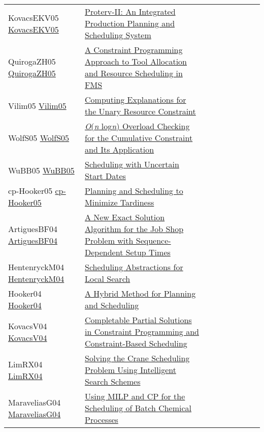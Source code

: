 {\begin{longtable}{p{3cm}p{7cm}lllllll}
KovacsEKV05 \href{https://doi.org/10.1007/11564751\_118}{KovacsEKV05} &  \href{papers/KovacsEKV05.pdf}{Proterv-II: An Integrated Production Planning and Scheduling System} &  &  &  &  &  &  & \\
QuirogaZH05 \href{https://doi.org/10.1109/ROBOT.2005.1570686}{QuirogaZH05} &  \href{papers/QuirogaZH05.pdf}{A Constraint Programming Approach to Tool Allocation and Resource Scheduling in {FMS}} &  &  &  &  &  &  & \\
Vilim05 \href{https://doi.org/10.1007/11493853\_29}{Vilim05} &  \href{papers/Vilim05.pdf}{Computing Explanations for the Unary Resource Constraint} &  &  &  &  &  &  & \\
WolfS05 \href{https://doi.org/10.1007/11963578\_8}{WolfS05} &  \href{papers/WolfS05.pdf}{\emph{O}(\emph{n} log\emph{n}) Overload Checking for the Cumulative Constraint and Its Application} &  &  &  &  &  &  & \\
WuBB05 \href{https://doi.org/10.1007/11564751\_110}{WuBB05} &  \href{papers/WuBB05.pdf}{Scheduling with Uncertain Start Dates} &  &  &  &  &  &  & \\
cp-Hooker05 \href{https://doi.org/10.1007/11564751\_25}{cp-Hooker05} &  \href{papers/cp-Hooker05.pdf}{Planning and Scheduling to Minimize Tardiness} &  &  &  &  &  &  & \\
ArtiguesBF04 \href{https://doi.org/10.1007/978-3-540-24664-0\_3}{ArtiguesBF04} &  \href{papers/ArtiguesBF04.pdf}{A New Exact Solution Algorithm for the Job Shop Problem with Sequence-Dependent Setup Times} &  &  &  &  &  &  & \\
HentenryckM04 \href{https://doi.org/10.1007/978-3-540-24664-0\_22}{HentenryckM04} &  \href{papers/HentenryckM04.pdf}{Scheduling Abstractions for Local Search} &  &  &  &  &  &  & \\
Hooker04 \href{https://doi.org/10.1007/978-3-540-30201-8\_24}{Hooker04} &  \href{papers/Hooker04.pdf}{A Hybrid Method for Planning and Scheduling} &  &  &  &  &  &  & \\
KovacsV04 \href{https://doi.org/10.1007/978-3-540-30201-8\_26}{KovacsV04} &  \href{papers/KovacsV04.pdf}{Completable Partial Solutions in Constraint Programming and Constraint-Based Scheduling} &  &  &  &  &  &  & \\
LimRX04 \href{https://doi.org/10.1007/978-3-540-30201-8\_59}{LimRX04} &  \href{papers/LimRX04.pdf}{Solving the Crane Scheduling Problem Using Intelligent Search Schemes} &  &  &  &  &  &  & \\
MaraveliasG04 \href{https://doi.org/10.1007/978-3-540-24664-0\_1}{MaraveliasG04} &  \href{papers/MaraveliasG04.pdf}{Using {MILP} and {CP} for the Scheduling of Batch Chemical Processes} &  &  &  &  &  &  & \\

\end{longtable}}
